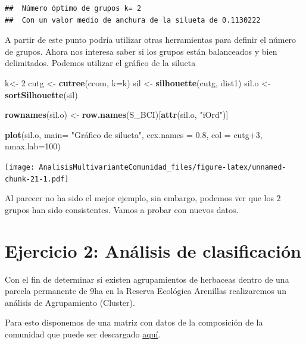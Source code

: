 \documentclass[]{book}
\newenvironment{Shaded}{\begin{snugshade}}{\end{snugshade}}
\newcommand{\KeywordTok}[1]{\textcolor[rgb]{0.13,0.29,0.53}{\textbf{{#1}}}}
\newcommand{\DataTypeTok}[1]{\textcolor[rgb]{0.13,0.29,0.53}{{#1}}}
\newcommand{\DecValTok}[1]{\textcolor[rgb]{0.00,0.00,0.81}{{#1}}}
\newcommand{\FloatTok}[1]{\textcolor[rgb]{0.00,0.00,0.81}{{#1}}}
\newcommand{\StringTok}[1]{\textcolor[rgb]{0.31,0.60,0.02}{{#1}}}
\newcommand{\NormalTok}[1]{{#1}}
\begin{document}
\begin{verbatim}
##  Número óptimo de grupos k= 2 
##  Con un valor medio de anchura de la silueta de 0.1130222
\end{verbatim}

A partir de este punto podría utilizar otras herramientas para definir
el número de grupos. Ahora nos interesa saber si los grupos están
balanceados y bien delimitados. Podemos utilizar el gráfico de la
silueta

\begin{Shaded}
\begin{Highlighting}[]
\NormalTok{k<-}\StringTok{ }\DecValTok{2}
\NormalTok{cutg <-}\StringTok{ }\KeywordTok{cutree}\NormalTok{(ccom, }\DataTypeTok{k=}\NormalTok{k)}
\NormalTok{sil <-}\StringTok{ }\KeywordTok{silhouette}\NormalTok{(cutg, dist1)}
\NormalTok{sil.o <-}\StringTok{ }\KeywordTok{sortSilhouette}\NormalTok{(sil)}

\KeywordTok{rownames}\NormalTok{(sil.o) <-}\StringTok{ }\KeywordTok{row.names}\NormalTok{(S_BCI)[}\KeywordTok{attr}\NormalTok{(sil.o, }\StringTok{"iOrd"}\NormalTok{)]}

\KeywordTok{plot}\NormalTok{(sil.o, }\DataTypeTok{main=} \StringTok{"Gráfico de silueta"}\NormalTok{, }\DataTypeTok{cex.names =} \FloatTok{0.8}\NormalTok{, }
     \DataTypeTok{col =} \NormalTok{cutg}\DecValTok{+3}\NormalTok{, }\DataTypeTok{nmax.lab=}\DecValTok{100}\NormalTok{)}
\end{Highlighting}
\end{Shaded}

\texttt{[image: AnalisisMultivarianteComunidad\_files/figure-latex/unnamed-chunk-21-1.pdf]}

Al parecer no ha sido el mejor ejemplo, sin embargo, podemos ver que los
2 grupos han sido consistentes. Vamos a probar con nuevos datos.

\section{Ejercicio 2: Análisis de
clasificación}\label{ejercicio-2-analisis-de-clasificacion}

Con el fin de determinar si existen agrupamientos de herbaceas dentro de
una parcela permanente de 9ha en la Reserva Ecológica Arenillas
realizaremos un análisis de Agrupamiento (Cluster).

Para esto disponemos de una matriz con datos de la composición de la
comunidad que puede ser descargado
\href{https://github.com/Ciespinosa/datos_practicas/blob/master/herbaceas.xlsx}{aquí}.
\end{document}
